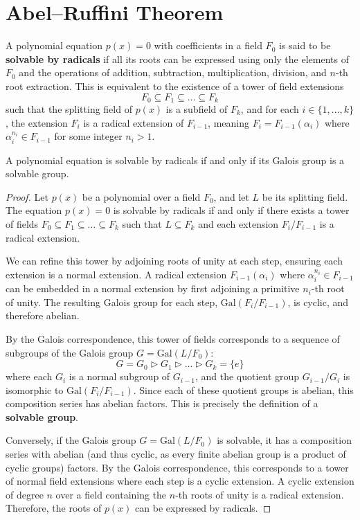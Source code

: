 \chapter{Abel–Ruffini Theorem}

\begin{definition}
A polynomial equation $p(x) = 0$ with coefficients in a field $F_0$ is said to be \textbf{solvable by radicals} if all its roots can be expressed using only the elements of $F_0$ and the operations of addition, subtraction, multiplication, division, and $n$-th root extraction.
This is equivalent to the existence of a tower of field extensions
$$F_0 \subseteq F_1 \subseteq \dots \subseteq F_k$$
such that the splitting field of $p(x)$ is a subfield of $F_k$, and for each $i \in \{1, \dots, k\}$, the extension $F_i$ is a radical extension of $F_{i-1}$, meaning $F_i = F_{i-1}(\alpha_i)$ where $\alpha_i^{n_i} \in F_{i-1}$ for some integer $n_i > 1$.
\end{definition}



\begin{lemma}
A polynomial equation is solvable by radicals if and only if its Galois group is a solvable group.
\end{lemma}

\begin{proof}
Let $p(x)$ be a polynomial over a field $F_0$, and let $L$ be its splitting field. The equation $p(x)=0$ is solvable by radicals if and only if there exists a tower of fields $F_0 \subseteq F_1 \subseteq \dots \subseteq F_k$ such that $L \subseteq F_k$ and each extension $F_i/F_{i-1}$ is a radical extension.

We can refine this tower by adjoining roots of unity at each step, ensuring each extension is a normal extension. A radical extension $F_{i-1}(\alpha_i)$ where $\alpha_i^{n_i} \in F_{i-1}$ can be embedded in a normal extension by first adjoining a primitive $n_i$-th root of unity. The resulting Galois group for each step, $\text{Gal}(F_i/F_{i-1})$, is cyclic, and therefore abelian.

By the Galois correspondence, this tower of fields corresponds to a sequence of subgroups of the Galois group $G = \text{Gal}(L/F_0)$:
$$G = G_0 \triangleright G_1 \triangleright \dots \triangleright G_k = \{e\}$$
where each $G_i$ is a normal subgroup of $G_{i-1}$, and the quotient group $G_{i-1}/G_i$ is isomorphic to $\text{Gal}(F_i/F_{i-1})$. Since each of these quotient groups is abelian, this composition series has abelian factors. This is precisely the definition of a \textbf{solvable group}.

Conversely, if the Galois group $G = \text{Gal}(L/F_0)$ is solvable, it has a composition series with abelian (and thus cyclic, as every finite abelian group is a product of cyclic groups) factors. By the Galois correspondence, this corresponds to a tower of normal field extensions where each step is a cyclic extension. A cyclic extension of degree $n$ over a field containing the $n$-th roots of unity is a radical extension. Therefore, the roots of $p(x)$ can be expressed by radicals.
\end{proof}



